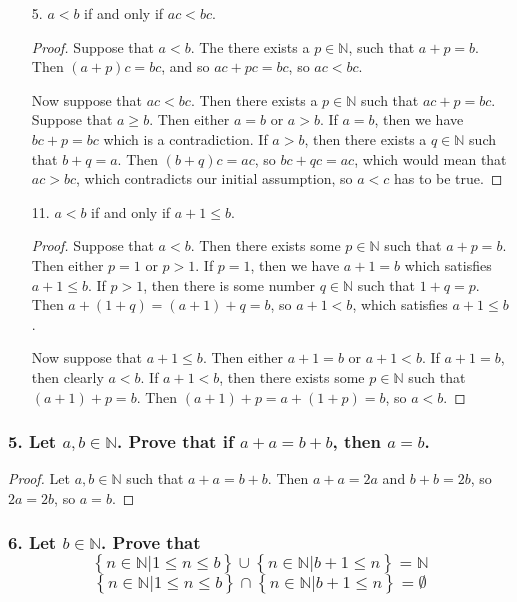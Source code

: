 \documentclass{article}
\newcommand{\N}{\mathbb{N}}
\begin{document}
\begin{enumerate}
\begin{proof}
		Now suppose that $a + c < b + c$. Then there exists some $p \in \N$ such that $a + c + p = b + c$. Since $a +p + c = b + c$, we know that $a + p = b$, so $a < b$.
	\end{proof}
	\item[5. ] $a < b$ if and only if $ac < bc$.
	\begin{proof}
		Suppose that $a < b$. The there exists a $p \in \N$, such that $a + p = b$. Then $(a + p)c = bc$, and so $ac + pc = bc$, so $ac < bc$.
		
		Now suppose that $ac < bc$. Then there exists a $p \in \N$ such that $ac + p = bc$. Suppose that $a \ge b$. Then either $a = b$ or $a > b$. If $a = b$, then we have $bc + p = bc$ which is a contradiction. If $a > b$, then there exists a $q \in \N$ such that $b + q = a$. Then $(b + q)c = ac$, so $bc + qc = ac$, which would mean that $ac > bc$, which contradicts our initial assumption, so $a < c$ has to be true.
	\end{proof}
	\item[11. ] $a < b$ if and only if $a + 1 \le b$.
	\begin{proof}
		Suppose that $a < b$. Then there exists some $p \in \N$ such that $a + p = b$. Then either $p = 1$ or $p > 1$. If $p = 1$, then we have $a + 1 = b$ which satisfies $a + 1 \le b$. If $p > 1$, then there is some number $q \in \N$ such that $1 + q = p$. Then $a + (1 + q) = (a + 1) + q = b$, so $a + 1 < b$, which satisfies $a + 1 \le b$.

		Now suppose that $a + 1 \le b$. Then either $a + 1 = b$ or $a + 1 < b$. If $a + 1 = b$, then clearly $a < b$. If $a + 1 < b$, then there exists some $p \in \N$ such that $(a + 1) + p = b$. Then $(a + 1) + p = a + (1 + p) = b$, so $a < b$.
	\end{proof}
\end{enumerate}

\subsubsection*{5. Let $a, b \in \N$. Prove that if $a + a = b + b$, then $a = b$.}

\begin{proof}
	Let $a,b \in \N$ such that $a + a = b + b$. Then $a + a = 2a$ and $b + b = 2b$, so $2a = 2b$, so $a = b$.
\end{proof}

\subsubsection*{6. Let $b \in \N$. Prove that
	\[\left\{n \in \N|1 \le n \le b\right\} \cup \left\{n \in \N | b + 1 \le n\right\} = \N\]
	\[\left\{n \in \N | 1 \le n \le b\right\} \cap \left\{n \in \N | b+1 \le n\right\} = \emptyset\]
}
\end{document}
